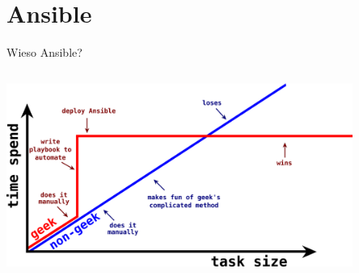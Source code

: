 \documentclass[aspectratio=169]{beamer}
\begin{document}
  
\section{Ansible} 
\begin{frame}{Wieso Ansible?}
    \begin{columns}
        \begin{column}{1.0\textwidth}
            \centering
            \includegraphics[width=0.85\textwidth]{why_ansible.png}
        \end{column} 
    \end{columns}
\end{frame}
\end{document}

